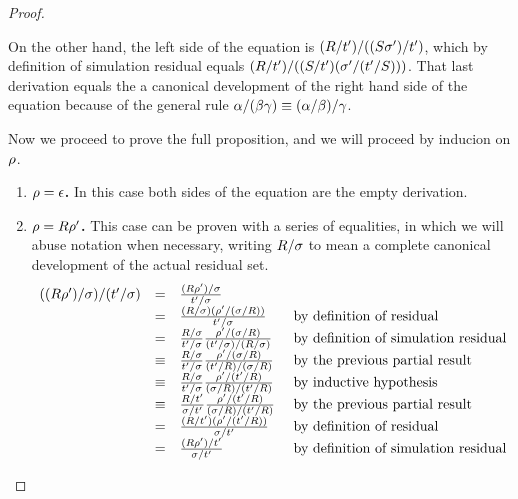 \begin{proof}
\begin{enumerate}
    On the other hand, the left side of the equation is $(R / t') / ((S \sigma') / t')$,
    which by definition of simulation residual equals
    $(R / t') / ((S / t') (\sigma' / (t' / S)))$.
    That last derivation equals the a canonical development of the
    right hand side of the equation because of the general
    rule $\alpha / (\beta \gamma) \equiv (\alpha / \beta) / \gamma$.
\end{enumerate}

Now we proceed to prove the full proposition, and we will proceed by inducion on $\rho$.
\begin{enumerate}
  \item {\bf $\rho = \epsilon$.} In this case both sides of the equation are the empty derivation.
  \item {\bf $\rho = R \rho'$.} This case can be proven with a series of equalities,
    in which we will abuse notation when necessary, writing $R / \sigma$ to mean a complete canonical development of the actual residual set.
    \[
      \begin{array}{rcll}
      ((R \rho')/\sigma)/(t'/\sigma)
        & = & \frac{(R \rho')/\sigma}{t'/\sigma} \\
        & = & \frac{(R / \sigma) (\rho' / (\sigma / R))}{t'/\sigma} & \text{ by definition of residual} \\
        & = & \frac{R / \sigma}{t' / \sigma} \frac{\rho' / (\sigma / R)}{(t' / \sigma) / (R / \sigma)} & \text{ by definition of simulation residual} \\
        & \equiv & \frac{R / \sigma}{t' / \sigma} \frac{\rho' / (\sigma / R)}{(t' / R) / (\sigma / R)} & \text{ by the previous partial result} \\
        & \equiv & \frac{R / \sigma}{t' / \sigma} \frac{\rho' / (t' / R)}{(\sigma / R) / (t' / R)} & \text{ by inductive hypothesis} \\
        & \equiv & \frac{R / t'}{\sigma / t'} \frac{\rho' / (t' / R)}{(\sigma / R) / (t' / R)} & \text{ by the previous partial result} \\
        & = & \frac{(R / t') (\rho' / (t' / R))}{\sigma / t'} & \text{ by definition of residual}\\
        & = & \frac{(R \rho') / t'}{\sigma / t'} & \text{ by definition of simulation residual}\\
      \end{array}
    \]
\end{enumerate}
\end{proof}


